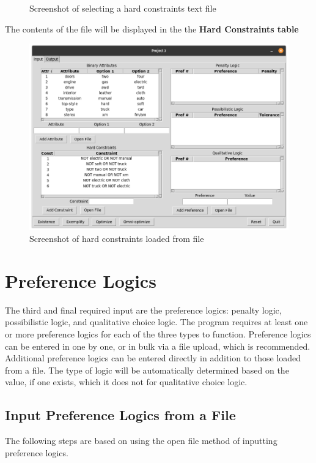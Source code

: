 \documentclass[12pt]{report}
\begin{document}
\begin{description}[leftmargin=4em]
\begin{figure}[H]
\begin{center}
\caption{Screenshot of selecting a hard constraints text file}
\end{center}
\end{figure}
\vspace{-2.5em}
\item [Result:] The contents of the file will be displayed in the the \textbf{Hard Constraints table}
\begin{figure}[H]
\begin{center}
\includegraphics[scale=0.275,trim=1cm 1cm 1cm 1cm]{constraints_imported}
\caption{Screenshot of hard constraints loaded from file}
\end{center}
\end{figure}
\vspace{-2.5em}
\end{description}

\section{Preference Logics}
The third and final required input are the preference logics: penalty logic, possibilistic logic, and qualitative choice logic. The program requires at least one or more preference logics for each of the three types to function. Preference logics can be entered in one by one, or in bulk via a file upload, which is recommended. Additional preference logics can be entered directly in addition to those loaded from a file. The type of logic will be automatically determined based on the value, if one exists, which it does not for qualitative choice logic.

\newpage
\subsection{Input Preference Logics from a File}
The following steps are based on using the open file method of inputting preference logics.\\
\end{document}
